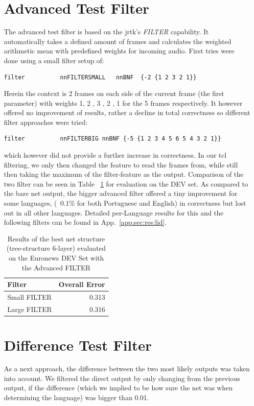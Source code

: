 \section{Advanced Test Filter}
\label{sec:eval:advanced}
The advanced test filter is based on the jrtk's \textit{FILTER} capability. It automatically takes a defined amount of frames and calculates the weighted arithmetic mean with predefined weights for incoming audio. First tries were done using a small filter setup of:
\begin{verbatim}
filter          nnFILTERSMALL   nnBNF  {-2 {1 2 3 2 1}}
\end{verbatim}  Herein the context is 2 frames on each side of the current frame (the first parameter) with weights 1, 2 , 3 , 2 , 1 for the 5 frames respectively.  It however offered no improvement of results, rather a decline in total correctness so different filter approaches were tried:
\begin{verbatim}
filter          nnFILTERBIG nnBNF {-5 {1 2 3 4 5 6 5 4 3 2 1}}
\end{verbatim}
which however did not provide a further increase in correctness. In our tcl filtering, we only then changed the feature to read the frames from, while still then taking the maximum of the filter-feature as the output. Comparison of the two filter can be seen  in Table ~\ref{tab:evalAdvanced} for evaluation on the DEV set. As compared to the bare net output, the bigger advanced filter offered a tiny improvement for some languages, (~0.1\% for both Portuguese and English) in correctness but lost out in all other languages. Detailed per-Language results for this and the following filters can be found in App.~\ref{app:sec:res:lid}.

\begin{table}[h!]
\centering
\caption{Results of the best net structure (tree-structure 6-layer) evaluated on the Euronews DEV Set with the Advanced FILTER}
\label{tab:evalAdvanced}
\begin{tabular}{| l | r |}
	\hline
	\textbf{Filter} & \textbf{Overall Error}  \\
	\hline
	Small FILTER  &  0.313 \\
	\hline
	Large FILTER & 0.316 \\
	\hline
\end{tabular}
\end{table}


\section{Difference Test Filter}
\label{sec:eval:variance}
As a next approach, the difference between the two most likely outputs was taken into account. We filtered the direct output by only changing from the previous output, if the difference (which we implied to be how sure the net was when determining the language) was bigger than 0.01. 

